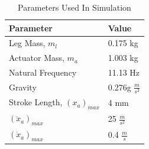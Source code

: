 \documentclass[11pt]{article}
\begin{document}
\begin{table}
\label{table:sim_parameters}
\begin{center}
\caption{Parameters Used In Simulation}
\vspace{0.1in}
\begin{tabular}{ll}
\hline
\hline
Parameter & Value  \\
\hline
Leg Mass, $m_l$ & 0.175 kg \\
Actuator Mass, $m_a$ & 1.003 kg  \\
Natural Frequency & 11.13 Hz \\
Gravity  & 0.276g $\frac{m}{s^2}$ \\[1ex]
\hline
Stroke Length, $(x_a)_{max}$ & 4 mm \\
$(\ddot{x}_a)_{max}$ & 25 $\frac{m}{s^2}$ \\
$(\dot{x}_a)_{max}$ & 0.4 $\frac{m}{s}$ \\
\end{tabular}
\end{center}
\end{table}

\end{document}
